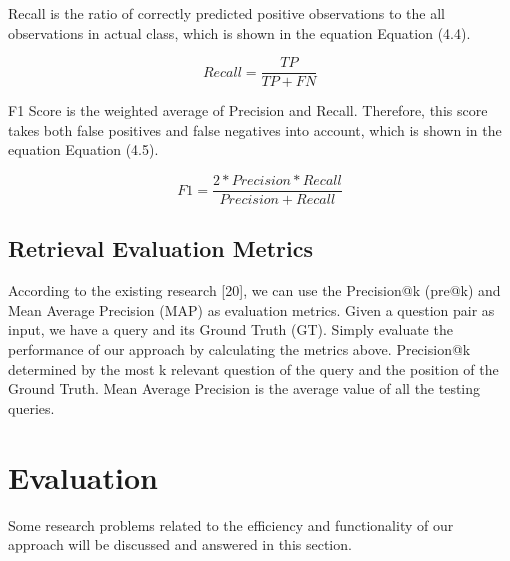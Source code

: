 	\par
	Recall is the ratio of correctly predicted positive observations to the all observations in actual class, which is shown in the equation Equation (4.4).
	\begin{normalsize}
		\begin{equation}
		Recall =  \frac{TP}{TP+FN}
		\end{equation}
	\end{normalsize}
	\par
	F1 Score is the weighted average of Precision and Recall. Therefore, this score takes both false positives and false negatives into account, which is shown in the equation Equation (4.5).
	\begin{normalsize}
		\begin{equation}
		F1 =  \frac{2*Precision*Recall}{Precision+Recall}
		\end{equation}
	\end{normalsize}
	
	\subsection{Retrieval Evaluation Metrics}
	According to the existing research [20], we can use the Precision@k (pre@k) and Mean Average Precision (MAP) as evaluation metrics. Given a question pair as input, we have a query and its Ground Truth (GT). Simply evaluate the performance of our approach by calculating the metrics above. Precision@k determined by the most k relevant question of the query and the position of the Ground Truth. Mean Average Precision is the average value of all the testing queries.\par	
	
	\section{Evaluation}
	Some research problems related to the efficiency and functionality of our approach will be discussed and answered in this section.
